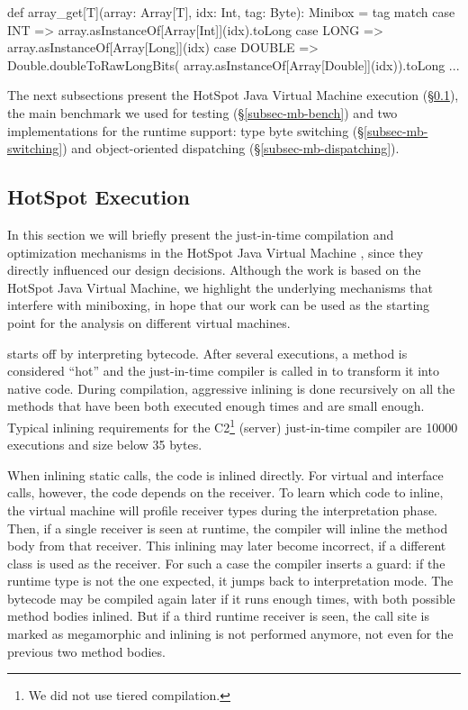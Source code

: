 \begin{lstlisting-nobreak}
 def array_get[T](array: Array[T], idx: Int, tag: Byte): Minibox = tag match {
   case INT =>     
     array.asInstanceOf[Array[Int]](idx).toLong
   case LONG =>    
     array.asInstanceOf[Array[Long]](idx)
   case DOUBLE =>  Double.doubleToRawLongBits(
     array.asInstanceOf[Array[Double]](idx)).toLong
   ...
 }
\end{lstlisting-nobreak}

 The next subsections present the HotSpot Java Virtual Machine execution (\S\ref{subsec-mb-jvm}), the main benchmark we used for testing (\S\ref{subsec-mb-bench}) and two implementations for the runtime support: type byte switching (\S\ref{subsec-mb-switching}) and object-oriented dispatching (\S\ref{subsec-mb-dispatching}).

\subsection{HotSpot Execution}
\label{subsec-mb-jvm}

 In this section we will briefly present the just-in-time compilation and optimization me\-cha\-ni\-sms in the HotSpot Java Virtual Machine \cite{hotspot-c1, hotspot-c2}, since they directly influenced our design decisions. Although the work is based on the HotSpot Java Virtual Machine, we highlight the underlying mechanisms that interfere with miniboxing, in hope that our work can be used as the starting point for the a\-na\-ly\-sis on different virtual machines. %

 starts off by interpreting bytecode. After several executions, a method is considered ``hot'' and the just-in-time compiler is called in to transform it into native code. During compilation, aggressive inlining is done recursively on all the methods that have been both executed enough times and are small enough. Typical inlining requirements for the C2\footnote{We did not use tiered compilation.} (server) just-in-time compiler are 10000 executions and size below 35 bytes.

When inlining static calls, the code is inlined directly. For virtual and interface calls, however, the code depends on the receiver. To learn which code to inline, the virtual machine will profile receiver types during the interpretation phase. Then, if a single receiver is seen at runtime, the compiler will inline the method body from that receiver. This inlining may later become incorrect, if a different class is used as the receiver. For such a case the compiler inserts a guard: if the runtime type is not the one expected, it jumps back to interpretation mode. The bytecode may be compiled again later if it runs enough times, with both possible method bodies inlined. But if a third runtime receiver is seen, the call site is marked as megamorphic and inlining is not performed anymore, not even for the previous two method bodies.

